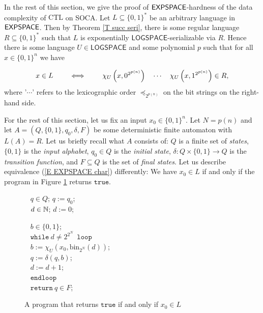 \documentclass[times,envcountsame]{llncs}
\renewcommand{\L}{\mathsf{LOGSPACE}}
\newcommand{\ctl}{\text{CTL}}
\begin{document}
In the rest of this section, we give the proof of ${\mathsf{EXPSPACE}}$-hardness
of the data complexity of $\ctl$ on SOCA.  Let $L\subseteq\{0,1\}^*$ be an arbitrary
language in ${\mathsf{EXPSPACE}}$. Then by Theorem \ref{T succ seri}, there is
some regular language $R\subseteq\{0,1\}^*$ such that $L$ is
exponentially $\L$-serializable via $R$. Hence there is some language $U\in\L$
and some polynomial $p$ such that for all $x\in\{0,1\}^n$ we have

\begin{eqnarray}{\label{E EXPSPACE char}}
x\in L\qquad\iff\qquad \chi_{U}\left(x,0^{2^{p(n)}}\right)
\quad \cdots\quad \chi_U\left(x,1^{2^{p(n)}}\right) \in R,
\end{eqnarray}
where '$\cdots$' refers to the lexicographic order $\preceq_{2^{p(n)}}$
on the bit strings on the right-hand side.

\noindent
For the rest of this section, let us fix an input $x_0\in\{0,1\}^n$.
Let $N=p(n)$ and let $A=(Q,\{0,1\},q_0,\delta,F)$ be some
deterministic finite automaton with $L(A)=R$.  Let us briefly recall
what $A$ consists of: $Q$ is a finite set of {\em states}, $\{0,1\}$
is the {\em input alphabet}, $q_0\in Q$ is the {\em initial state},
$\delta:Q\times\{0,1\}\rightarrow Q$ is the {\em transition function},
and $F\subseteq Q$ is the set of {\em final states}.  Let us describe
equivalence (\ref{E EXPSPACE char}) differently: We have $x_0\in L$ if
and only if the program in Figure \ref{F U} returns $\mathtt{true}$.

\begin{figure}
\normalsize

\ \hspace{5cm} $q\in Q$; $q:=q_0$;\\[-0.4cm]

\ \hspace{5cm} $d\in\mathbb{N}$; $d:=0$;

\ \hspace{5cm} $b\in\{0,1\}$;\\[-0.4cm]

\ \hspace{5cm} $\mathtt{while }\  d\not=2^{2^N}$\ $\mathtt{ loop}$\\[-0.4cm]

\ \hspace{6cm} $b:=\chi_U(x_0,\text{bin}_{2^N}(d))$;\\[-0.4cm]

\ \hspace{6cm} $q:=\delta(q,b)$;\\[-0.4cm]

\ \hspace{6cm} $d:=d+1$;\\[-0.4cm]

\ \hspace{5cm} $\mathtt{end loop}$\\[-0.4cm]

\ \hspace{5cm} $\mathtt{return}\ q\in F$;%

\caption{A program that returns $\mathtt{true}$ if and only if $x_0\in L$}{\label{F U}}
\end{figure}
\end{document}
